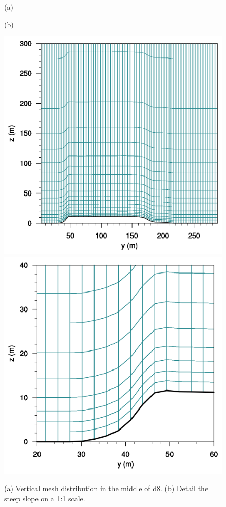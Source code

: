 \begin{figure}[H]
	\centering
	\begin{minipage}{0.5\linewidth}
		\center\hspace{3.3cm}(a)
	\end{minipage}%
	\begin{minipage}{0.5\linewidth}
		\center\hspace{-2.0cm}(b)
	\end{minipage}%
	
	\includegraphics[width=0.35\linewidth,trim={0cm 0cm -0cm 0cm},clip]{Imagenes/05/mesh_y50}
	\includegraphics[width=0.35\linewidth,trim={0cm 0cm 0cm 0cm},clip]{Imagenes/05/hd_mesh_50}%
	
	\caption{(a) Vertical mesh distribution in the middle of d8. (b) Detail the steep slope on a 1:1 scale.}
	\label{fig:05_mesh_bol}
\end{figure}

\begin{table}[H]
	\caption{Characteristic values of each domain for B1, B2 and B3.}\label{tab:05_caract_bol}
	\centering\footnotesize{}
\end{table}

